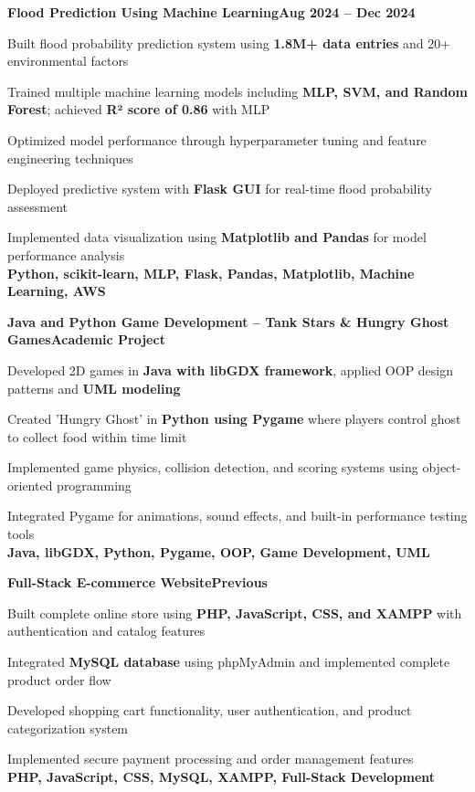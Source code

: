 \documentclass[letterpaper,10pt]{article}
\newcommand{\heading}[2]{
  \hspace{10pt}#1\hfill#2\\
}
\newcommand{\headingBf}[2]{
  \heading{\textbf{#1}}{\textbf{#2}}
}
\newenvironment{resume_list}{
  \vspace{-7pt}
  \begin{itemize}[itemsep=-2px, parsep=1pt, leftmargin=30pt]
}{
  \end{itemize}
}
\begin{document}
  \headingBf{Flood Prediction Using Machine Learning}{Aug 2024 -- Dec 2024}
  \begin{resume_list}
    \item Built flood probability prediction system using \textbf{1.8M+ data entries} and 20+ environmental factors
    \item Trained multiple machine learning models including \textbf{MLP, SVM, and Random Forest}; achieved \textbf{R² score of 0.86} with MLP
    \item Optimized model performance through hyperparameter tuning and feature engineering techniques
    \item Deployed predictive system with \textbf{Flask GUI} for real-time flood probability assessment
    \item Implemented data visualization using \textbf{Matplotlib and Pandas} for model performance analysis
    \\
    \textbf{Python, scikit-learn, MLP, Flask, Pandas, Matplotlib, Machine Learning, AWS}
  \end{resume_list}

  \headingBf{Java and Python Game Development -- Tank Stars \& Hungry Ghost Games}{Academic Project}
  \begin{resume_list}
    \item Developed 2D games in \textbf{Java with libGDX framework}, applied OOP design patterns and \textbf{UML modeling}
    \item Created 'Hungry Ghost' in \textbf{Python using Pygame} where players control ghost to collect food within time limit
    \item Implemented game physics, collision detection, and scoring systems using object-oriented programming
    \item Integrated Pygame for animations, sound effects, and built-in performance testing tools
    \\
    \textbf{Java, libGDX, Python, Pygame, OOP, Game Development, UML}
  \end{resume_list}

  \headingBf{Full-Stack E-commerce Website}{Previous}
  \begin{resume_list}
    \item Built complete online store using \textbf{PHP, JavaScript, CSS, and XAMPP} with authentication and catalog features
    \item Integrated \textbf{MySQL database} using phpMyAdmin and implemented complete product order flow
    \item Developed shopping cart functionality, user authentication, and product categorization system
    \item Implemented secure payment processing and order management features
    \\
    \textbf{PHP, JavaScript, CSS, MySQL, XAMPP, Full-Stack Development}
  \end{resume_list}
\end{document}
